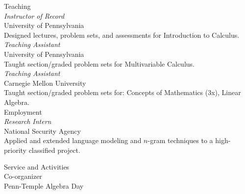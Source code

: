 \documentclass{article}
\begin{document}
\vspace{0.25in}

\newpage
\Large{Teaching}\vspace{0.2in}\\
\normalsize
{}\textit{Instructor of Record}\\
	University of Pennsylvania\\
	\small{Designed lectures, problem sets, and assessments for Introduction to Calculus.}\normalsize\\
	
	\normalsize\textit{Teaching Assistant}\marginpar[\raggedleft{2020 - 2021}]{}\\
	\marginpar[\raggedleft{2024 - 2025}]{}University of Pennsylvania\\
	\small{Taught section/graded problem sets for Multivariable Calculus}.\\
	
	\normalsize\textit{Teaching Assistant}\marginpar[\raggedleft{2016 - 2019}]{}\\
	Carnegie Mellon University\\
	\small{Taught section/graded problem sets for: Concepts of Mathematics (3x), Linear Algebra.} \normalsize\\

\vspace{0.25in}
\Large{Employment}\vspace{0.2in}\\
\normalsize
\marginpar[\raggedleft{2018}]{}\textit{Research Intern}\\
	National Security Agency\\
	\small{Applied and extended language modeling and $n$-gram techniques to a high-priority classified project.}
	\normalsize

\vspace{0.25in}
\Large{Service and Activities}\vspace{0.2in}\\
\normalsize
Co-organizer\marginpar[\raggedleft{2024 - 2025}]{}\\
Penn-Temple Algebra Day\\
\end{document}
